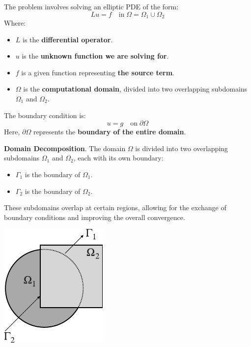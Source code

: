 \highspace
\begin{examplebox}
    The problem involves solving an elliptic PDE of the form:
    \begin{equation*}
        Lu = f \hspace{1em} \text{in} \; \Omega = \Omega_{1} \cup \Omega_{2}
    \end{equation*}
    Where:
    \begin{itemize}
        \item $L$ is the \textbf{differential operator}.
        \item $u$ is the \textbf{unknown function we are solving for}.
        \item $f$ is a given function representing \textbf{the source term}.
        \item $\Omega$ is the \textbf{computational domain}, divided into two overlapping subdomains $\Omega_{1}$ and $\Omega_{2}$.
    \end{itemize}
    The boundary condition is:
    \begin{equation*}
        u = g \hspace{1em} \text{on} \; \partial \Omega
    \end{equation*}
    Here, $\partial \Omega$ represents the \textbf{boundary of the entire domain}.

    \highspace
    \textbf{Domain Decomposition}. The domain $\Omega$ is divided into two overlapping subdomains $\Omega_{1}$ and $\Omega_{2}$, each with its own boundary:
    \begin{itemize}
        \item $\Gamma_{1}$ is the boundary of $\Omega_{1}$.
        \item $\Gamma_{2}$ is the boundary of $\Omega_{2}$.
    \end{itemize}
    These subdomains overlap at certain regions, allowing for the exchange of boundary conditions and improving the overall convergence.
    \begin{center}
        \includegraphics[width=.3\textwidth]{img/elliptic-pde-1.pdf}
    \end{center}


\end{examplebox}
